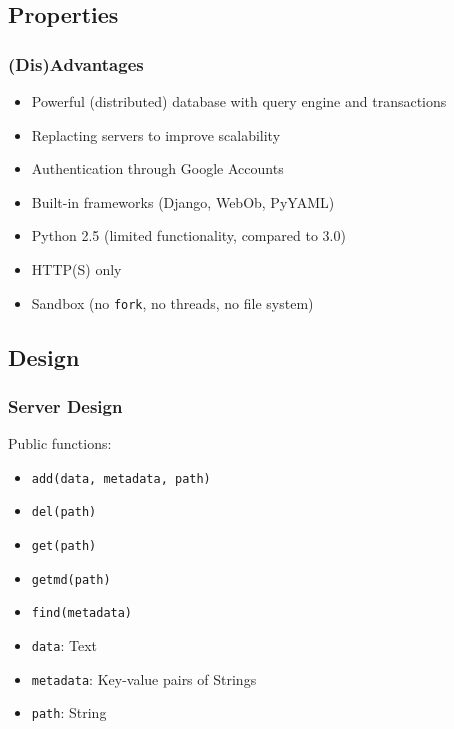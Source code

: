 \documentclass{beamer}
\begin{document}
\subsection{Properties}
\frame
{
	\frametitle{(Dis)Advantages}
	\begin{itemize}
		\item <1->Powerful (distributed) database with query engine and
			transactions
		\item <1->Replacting servers to improve scalability 
		\item <1->Authentication through Google Accounts
		\item <1->Built-in frameworks (Django, WebOb, PyYAML)
	\end{itemize}

	\begin{itemize}
		\item <2->Python 2.5 (limited functionality, compared to 3.0)
		\item <2->HTTP(S) only
		\item <2->Sandbox (no \texttt{fork}, no threads, no file system)
	\end{itemize}
}

\subsection{Design}
\frame
{
	\frametitle{Server Design}
	Public functions:
	\begin{itemize}
		\item <1->\texttt{add(data, metadata, path)}
		\item <1->\texttt{del(path)}
		\item <1->\texttt{get(path)}
		\item <1->\texttt{getmd(path)}
		\item <1->\texttt{find(metadata)}
	\end{itemize}
	\begin{itemize}
		\item <2->\texttt{data}: Text
		\item <2->\texttt{metadata}: Key-value pairs of Strings
		\item <2->\texttt{path}: String
	\end{itemize}
}
\end{document}
